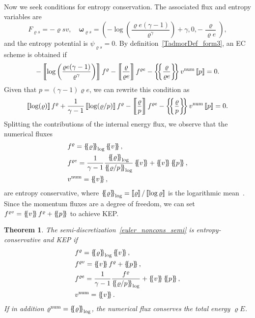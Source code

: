 \documentclass[]{scrartcl}
\newcommand*{\ldblbrace}{\{\mskip-5mu \left \{}
\newcommand*{\rdblbrace}{ \}\mskip-5mu \right \}}
\newcommand{\mean}[1]{\left\ldblbrace #1 \right\rdblbrace}
\renewcommand{\vec}[1]{\boldsymbol{#1}}
\newcommand{\jump}[1]{\left\llbracket #1  \right\rrbracket}
\newtheorem{theorem}{Theorem}[section]
\theoremstyle{definition}
\begin{document}
Now we seek conditions for entropy conservation. The associated flux and entropy variables are
\begin{equation}
    F_{\varrho s} = -\varrho s v,
    \quad
    \vec{\omega}_{\varrho s} = \left (
        -\log \left ( \frac{\varrho e (\gamma-1)}{\varrho^{\gamma}}\right ) + \gamma,
         0,
         -\frac{\varrho}{\varrho e}
    \right ),
\end{equation}
and the entropy potential is $\psi_{\varrho s} = 0$.
By definition~\eqref{TadmorDef_form3}, an EC scheme is obtained if
\begin{equation}
    -\jump{\log \left ( \frac{\varrho e (\gamma-1)}{\varrho^{\gamma}}\right )} f^{\varrho}
    - \jump{\frac{\varrho}{\varrho e}} f^{\varrho e}
    - \mean{\frac{\varrho}{\varrho e}} v^{\mathrm{num}} \jump{p} = 0.
\end{equation}
Given that $p = (\gamma-1) \varrho e$, we can rewrite this condition as
\begin{equation}
    \jump{\log ( \varrho)}f^{\varrho}
    + \frac{1}{\gamma - 1} \jump{\log(\varrho/p)} f^{\varrho}
    - \jump{\frac{\varrho}{p}}f^{\varrho e}
    - \mean{\frac{\varrho}{p}}v^{\mathrm{num}}\jump{p} = 0.
\end{equation}
Splitting the contributions of the internal energy flux, we observe that the numerical fluxes
\begin{equation}
\begin{aligned}
& f^{\varrho}= \mean{\varrho}_{\log} \mean{v},\\
& f^{\varrho e} = \frac{1}{\gamma-1}\frac{\mean{\varrho}_{\log}}{\mean{\varrho/p}_{\log}} \mean{v} + \mean{v}\mean{p},\\
& v^{\mathrm{num}} = \mean{v},
\end{aligned}
\end{equation}
are entropy conservative, where $\mean{\varrho}_{\log} = \jump{\varrho} / \jump{\log \varrho}$ is the logarithmic mean~\cite{ismail2009affordable}.
Since the momentum fluxes are a degree of freedom, we can set $f^{\varrho v} = \mean{v} f^{\varrho} + \mean{p}$ to achieve KEP.
\begin{theorem}
The semi-discretization~\eqref{euler_noncons_semi} is entropy-conservative and KEP if
\begin{equation}
\label{eq:ec_and_kep_fluxes}
\begin{aligned}
    & f^{\varrho}= \mean{\varrho}_{\log} \mean{v},\\
    & f^{\varrho v} = \mean{v} f^{\varrho} + \mean{p},\\
    & f^{\varrho e} = \frac{1}{\gamma-1}\frac{f^{\varrho}}{\mean{\varrho/p}_{\log}} + \mean{v}\mean{p},\\
    & v^{\mathrm{num}} = \mean{v}.
\end{aligned}
\end{equation}
If in addition $\varrho^{\mathrm{num}} = \mean{\varrho}_{\log}$, the numerical flux conserves the total energy $\varrho E$.
\end{theorem}
\end{document}

